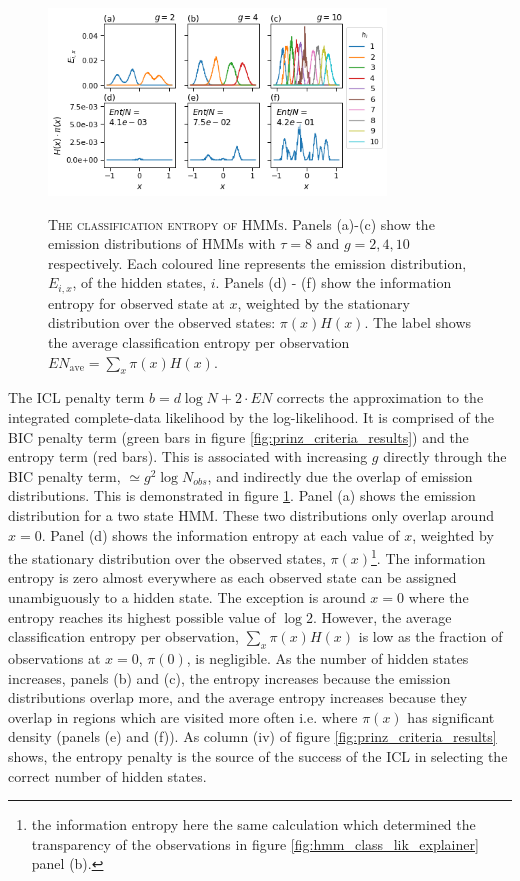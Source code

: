 \begin{figure}
    \centering
    \caption[The classification entropy of HMMs]{\textsc{The classification entropy of HMMs}. Panels (a)-(c) show the emission distributions of HMMs with $\tau=8$ and $g = 2, 4, 10$ respectively. Each coloured line represents the emission distribution, $E_{i, x}$,  of the hidden states, $i$. Panels (d) - (f) show the information entropy for observed state at $x$, weighted by the stationary distribution over the observed states: $\pi(x)H(x)$. The label shows the average classification entropy per observation $EN_{\mathrm{ave}} = \sum_{x}\pi(x)H(x)$.}
    \includegraphics[width=0.8\textwidth]{chapters/hmm_selection/figures/prinz_entropy.png}
    \label{fig:prinz_ent}
\end{figure}

The ICL penalty term $b=d\log{N}+2\cdot EN$ corrects the approximation to the integrated complete-data likelihood by the log-likelihood. It is comprised of the BIC penalty term (green bars in figure \ref{fig:prinz_criteria_results}) and the entropy term (red bars). This is associated with increasing $g$ directly through the BIC penalty term, $\simeq g^{2}\log{N_{obs}}$, and indirectly due the overlap of emission distributions. This is demonstrated in figure \ref{fig:prinz_ent}. Panel (a) shows the emission distribution for a two state HMM. These two distributions only overlap around $x=0$. Panel (d) shows the information entropy at each value of $x$, weighted by the stationary distribution over the observed states, $\pi(x)$\footnote{the information entropy here the same calculation which determined the transparency of the observations in figure \ref{fig:hmm_class_lik_explainer} panel (b).}. The information entropy is zero almost everywhere as each observed state can be assigned unambiguously to a hidden state. The exception is around $x=0$ where the entropy reaches its highest possible value of $\log{2}$. However, the average classification entropy per observation, $\sum_{x}\pi(x)H(x)$ is low as the fraction of observations at $x=0$, $\pi(0)$, is negligible. As the number of hidden states increases, panels (b) and (c), the  entropy increases because the emission distributions overlap more, and the average entropy increases because they overlap in regions which are visited more often i.e. where $\pi(x)$ has significant density (panels (e) and (f)). As column (iv) of figure \ref{fig:prinz_criteria_results} shows, the entropy penalty is the source of the success of the ICL in selecting  the correct number of hidden states. 

